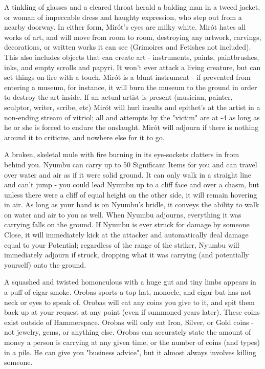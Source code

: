
A tinkling of glasses and a cleared throat herald a balding man in a tweed jacket, or woman of impeccable dress and haughty expression, who step out from a nearby doorway.  In either form, Mirót's eyes are milky white.  Mirót hates all works of art, and will move from room to room, destroying any artwork, carvings, decorations, or written works it can see (Grimoires and Fetishes not included).  This also includes objects that can create art - instruments, paints, paintbrushes, inks, and empty scrolls and papyri.  It won't ever attack a living creature, but can set things on fire with a touch.  Mirót is a blunt instrument - if prevented from entering a museum, for instance, it will burn the museum to the ground in order to destroy the art inside.  If an actual artist is present (musician, painter, sculptor, writer, scribe, etc) Mirót will hurl insults and epithet's at the artist in a non-ending stream of vitriol; all \RO and \RS attempts by the "victim" are at -4 as long as he or she is forced to endure the onslaught.  Mirót will adjourn if there is nothing around it to criticize, and nowhere else for it to go.



A broken, skeletal mule with fire burning in its eye-sockets clatters in from behind you.  Nyumbu can carry up to 50 Significant Items for you and can travel over water and air as if it were solid ground.  It can only walk in a straight line and can't jump - you could lead Nyumbu up to a cliff face and over a chasm, but unless there were a cliff of equal height on the other side, it will remain hovering in air.  As long as your hand is on Nyumbu's bridle, it conveys the ability to walk on water and air to you as well.  When Nyumbu adjourns, everything it was carrying falls on the ground.  If Nyumbu is ever struck for damage by someone Close, it will immediately kick at the attacker and automatically deal damage equal to your Potential; regardless of the range of the striker, Nyumbu will immediately adjourn if struck, dropping what it was carrying (and potentially yourself) onto the ground.


A squashed and twisted homonculous with a huge gut and tiny limbs appears in a puff of cigar smoke.  Orobas sports a top hat, monocle, and cigar but has not neck or eyes to speak of.  Orobas will eat any coins you give to it, and spit them back up at your request at any point (even if summoned years later).  These coins exist outside of Hammerspace.  Orobas will only eat Iron, Silver, or Gold coins - not jewelry, gems, or anything else.  Orobas can accurately state the amount of money a person is carrying at any given time, or the number of coins (and types) in a pile.  He can give you "business advice", but it almost always involves killing someone.


